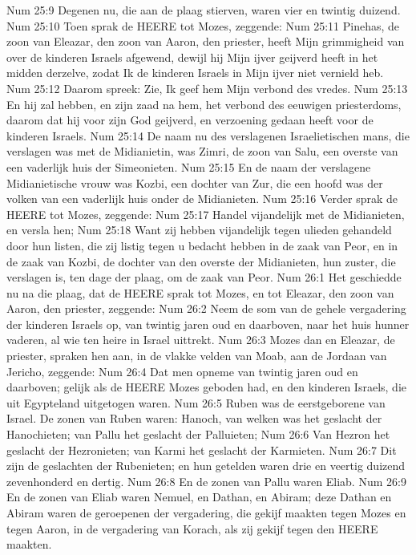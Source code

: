 Num 25:9  Degenen nu, die aan de plaag stierven, waren vier en twintig duizend.
Num 25:10  Toen sprak de HEERE tot Mozes, zeggende:
Num 25:11  Pinehas, de zoon van Eleazar, den zoon van Aaron, den priester, heeft Mijn grimmigheid van over de kinderen Israels afgewend, dewijl hij Mijn ijver geijverd heeft in het midden derzelve, zodat Ik de kinderen Israels in Mijn ijver niet vernield heb.
Num 25:12  Daarom spreek: Zie, Ik geef hem Mijn verbond des vredes.
Num 25:13  En hij zal hebben, en zijn zaad na hem, het verbond des eeuwigen priesterdoms, daarom dat hij voor zijn God geijverd, en verzoening gedaan heeft voor de kinderen Israels.
Num 25:14  De naam nu des verslagenen Israelietischen mans, die verslagen was met de Midianietin, was Zimri, de zoon van Salu, een overste van een vaderlijk huis der Simeonieten.
Num 25:15  En de naam der verslagene Midianietische vrouw was Kozbi, een dochter van Zur, die een hoofd was der volken van een vaderlijk huis onder de Midianieten.
Num 25:16  Verder sprak de HEERE tot Mozes, zeggende:
Num 25:17  Handel vijandelijk met de Midianieten, en versla hen;
Num 25:18  Want zij hebben vijandelijk tegen ulieden gehandeld door hun listen, die zij listig tegen u bedacht hebben in de zaak van Peor, en in de zaak van Kozbi, de dochter van den overste der Midianieten, hun zuster, die verslagen is, ten dage der plaag, om de zaak van Peor.
Num 26:1  Het geschiedde nu na die plaag, dat de HEERE sprak tot Mozes, en tot Eleazar, den zoon van Aaron, den priester, zeggende:
Num 26:2  Neem de som van de gehele vergadering der kinderen Israels op, van twintig jaren oud en daarboven, naar het huis hunner vaderen, al wie ten heire in Israel uittrekt.
Num 26:3  Mozes dan en Eleazar, de priester, spraken hen aan, in de vlakke velden van Moab, aan de Jordaan van Jericho, zeggende:
Num 26:4  Dat men opneme van twintig jaren oud en daarboven; gelijk als de HEERE Mozes geboden had, en den kinderen Israels, die uit Egypteland uitgetogen waren.
Num 26:5  Ruben was de eerstgeborene van Israel. De zonen van Ruben waren: Hanoch, van welken was het geslacht der Hanochieten; van Pallu het geslacht der Palluieten;
Num 26:6  Van Hezron het geslacht der Hezronieten; van Karmi het geslacht der Karmieten.
Num 26:7  Dit zijn de geslachten der Rubenieten; en hun getelden waren drie en veertig duizend zevenhonderd en dertig.
Num 26:8  En de zonen van Pallu waren Eliab.
Num 26:9  En de zonen van Eliab waren Nemuel, en Dathan, en Abiram; deze Dathan en Abiram waren de geroepenen der vergadering, die gekijf maakten tegen Mozes en tegen Aaron, in de vergadering van Korach, als zij gekijf tegen den HEERE maakten.
